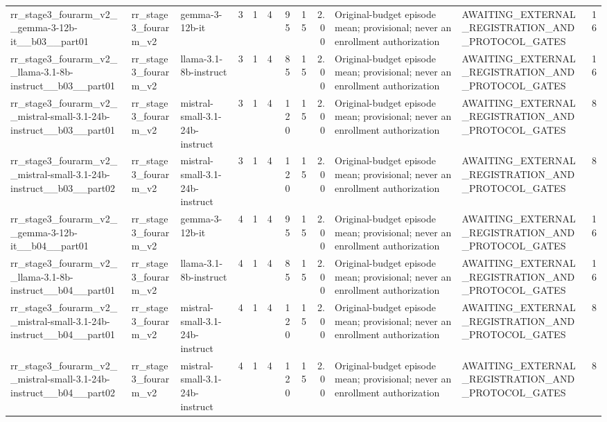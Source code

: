 \begin{tabular}{lllrrrrrrllr}
rr\_stage3\_fourarm\_v2\_\_gemma-3-12b-it\_\_b03\_\_part01 & rr\_stage3\_fourarm\_v2 & gemma-3-12b-it & 3 & 1 & 4 & 95 & 15 & 2.00 & Original-budget episode mean; provisional; never an enrollment authorization & AWAITING\_EXTERNAL\_REGISTRATION\_AND\_PROTOCOL\_GATES & 16 \\
rr\_stage3\_fourarm\_v2\_\_llama-3.1-8b-instruct\_\_b03\_\_part01 & rr\_stage3\_fourarm\_v2 & llama-3.1-8b-instruct & 3 & 1 & 4 & 85 & 15 & 2.00 & Original-budget episode mean; provisional; never an enrollment authorization & AWAITING\_EXTERNAL\_REGISTRATION\_AND\_PROTOCOL\_GATES & 16 \\
rr\_stage3\_fourarm\_v2\_\_mistral-small-3.1-24b-instruct\_\_b03\_\_part01 & rr\_stage3\_fourarm\_v2 & mistral-small-3.1-24b-instruct & 3 & 1 & 4 & 120 & 15 & 2.00 & Original-budget episode mean; provisional; never an enrollment authorization & AWAITING\_EXTERNAL\_REGISTRATION\_AND\_PROTOCOL\_GATES & 8 \\
rr\_stage3\_fourarm\_v2\_\_mistral-small-3.1-24b-instruct\_\_b03\_\_part02 & rr\_stage3\_fourarm\_v2 & mistral-small-3.1-24b-instruct & 3 & 1 & 4 & 120 & 15 & 2.00 & Original-budget episode mean; provisional; never an enrollment authorization & AWAITING\_EXTERNAL\_REGISTRATION\_AND\_PROTOCOL\_GATES & 8 \\
rr\_stage3\_fourarm\_v2\_\_gemma-3-12b-it\_\_b04\_\_part01 & rr\_stage3\_fourarm\_v2 & gemma-3-12b-it & 4 & 1 & 4 & 95 & 15 & 2.00 & Original-budget episode mean; provisional; never an enrollment authorization & AWAITING\_EXTERNAL\_REGISTRATION\_AND\_PROTOCOL\_GATES & 16 \\
rr\_stage3\_fourarm\_v2\_\_llama-3.1-8b-instruct\_\_b04\_\_part01 & rr\_stage3\_fourarm\_v2 & llama-3.1-8b-instruct & 4 & 1 & 4 & 85 & 15 & 2.00 & Original-budget episode mean; provisional; never an enrollment authorization & AWAITING\_EXTERNAL\_REGISTRATION\_AND\_PROTOCOL\_GATES & 16 \\
rr\_stage3\_fourarm\_v2\_\_mistral-small-3.1-24b-instruct\_\_b04\_\_part01 & rr\_stage3\_fourarm\_v2 & mistral-small-3.1-24b-instruct & 4 & 1 & 4 & 120 & 15 & 2.00 & Original-budget episode mean; provisional; never an enrollment authorization & AWAITING\_EXTERNAL\_REGISTRATION\_AND\_PROTOCOL\_GATES & 8 \\
rr\_stage3\_fourarm\_v2\_\_mistral-small-3.1-24b-instruct\_\_b04\_\_part02 & rr\_stage3\_fourarm\_v2 & mistral-small-3.1-24b-instruct & 4 & 1 & 4 & 120 & 15 & 2.00 & Original-budget episode mean; provisional; never an enrollment authorization & AWAITING\_EXTERNAL\_REGISTRATION\_AND\_PROTOCOL\_GATES & 8 \\

\end{tabular}

